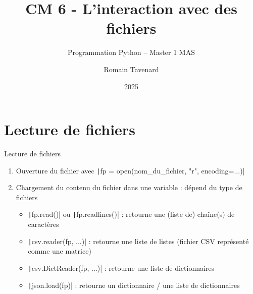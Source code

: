\documentclass[10pt]{beamer}
\title[M1 MAS -- Python -- Fichiers]{CM 6 - L'interaction avec des fichiers}
\subtitle{Programmation Python -- Master 1 MAS}
\author{Romain Tavenard}
\date{2025}
\institute{%
\hypersetup{urlcolor=.}
\makebox[2.2ex][c]{\faEnvelope}\enspace\href{mailto:romain.tavenard@univ-rennes2.fr}{\texttt{romain.tavenard@univ-rennes2.fr}}\\%
}
\begin{document}
\maketitle

\section{Lecture de fichiers}
\begin{frame}[fragile]{Lecture de fichiers}
  \begin{enumerate}
    \item Ouverture du fichier avec \texttt|fp = open(nom_du_fichier, "r", encoding=...)|
    \item Chargement du contenu du fichier dans une variable : dépend du type de fichiers
    \begin{itemize}
      \item \texttt|fp.read()| ou \texttt|fp.readlines()| : retourne une (liste de) chaîne(s) de caractères
      \item \texttt|csv.reader(fp, ...)| : retourne une liste de listes (fichier CSV représenté comme une matrice)
      \item \texttt|csv.DictReader(fp, ...)| : retourne une liste de dictionnaires
      \item \texttt|json.load(fp)| : retourne un dictionnaire / une liste de dictionnaires
    \end{itemize}
  \end{enumerate}

\end{frame}
\end{document}
